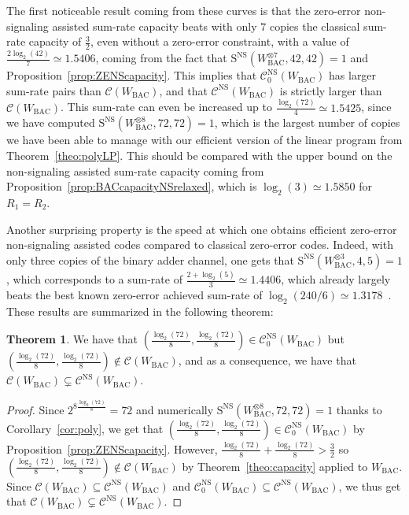 \documentclass[11pt]{article}
\theoremstyle{definition}
\newtheorem{theo}{Theorem}[section]
\theoremstyle{remark}
\begin{document}
  The first noticeable result coming from these curves is that the zero-error non-signaling assisted sum-rate capacity beats with only $7$ copies the classical sum-rate capacity of $\frac{3}{2}$, even without a zero-error constraint, with a value of $\frac{2\log_2(42)}{7} \simeq 1.5406$, coming from the fact that $\mathrm{S}^{\mathrm{NS}}(W^{\otimes 7}_{\mathrm{BAC}},42,42)=1$ and Proposition~\ref{prop:ZENScapacity}. This implies that $\mathcal{C}^{\mathrm{NS}}_0(W_{\text{BAC}})$ has larger sum-rate pairs than $\mathcal{C}(W_{\text{BAC}})$, and that $\mathcal{C}^{\mathrm{NS}}(W_{\text{BAC}})$ is strictly larger than $\mathcal{C}(W_{\text{BAC}})$. This sum-rate can even be increased up to $\frac{\log_2(72)}{4} \simeq 1.5425$, since we have computed $\mathrm{S}^{\mathrm{NS}}(W^{\otimes 8}_{\mathrm{BAC}},72,72)=1$, which is the largest number of copies we have been able to manage with our efficient version of the linear program from Theorem~\ref{theo:polyLP}. This should be compared with the upper bound on the non-signaling assisted sum-rate capacity coming from Proposition~\ref{prop:BACcapacityNSrelaxed}, which is $\log_2(3) \simeq 1.5850$ for $R_1=R_2$.

  Another surprising property is the speed at which one obtains efficient zero-error non-signaling assisted codes compared to classical zero-error codes. Indeed, with only three copies of the binary adder channel, one gets that $\mathrm{S}^{\mathrm{NS}}(W^{\otimes 3}_{\mathrm{BAC}},4,5)=1$, which corresponds to a sum-rate of $\frac{2+\log_2(5)}{3} \simeq 1.4406$, which already largely beats the best known zero-error achieved sum-rate of $\log_2(240/6) \simeq 1.3178$~\cite{MO05}. These results are summarized in the following theorem:

  \begin{theo}
    \label{theo:BAC}
    We have that $\left(\frac{\log_2(72)}{8},\frac{\log_2(72)}{8}\right) \in \mathcal{C}^{\mathrm{NS}}_0(W_{\mathrm{BAC}})$ but $\left(\frac{\log_2(72)}{8},\frac{\log_2(72)}{8}\right) \not\in \mathcal{C}(W_{\mathrm{BAC}})$, and as a consequence, we have that $\mathcal{C}(W_{\mathrm{BAC}}) \subsetneq \mathcal{C}^{\mathrm{NS}}(W_{\mathrm{BAC}})$.
  \end{theo}
  \begin{proof}
    Since $2^{8\frac{\log_2(72)}{8}}=72$ and numerically $\mathrm{S}^{\mathrm{NS}}(W^{\otimes 8}_{\mathrm{BAC}},72,72)=1$ thanks to Corollary~\ref{cor:poly}, we get that  $\left(\frac{\log_2(72)}{8},\frac{\log_2(72)}{8}\right) \in \mathcal{C}^{\mathrm{NS}}_0(W_{\mathrm{BAC}})$ by Proposition~\ref{prop:ZENScapacity}. However, $\frac{\log_2(72)}{8}+\frac{\log_2(72)}{8} > \frac{3}{2}$ so $\left(\frac{\log_2(72)}{8},\frac{\log_2(72)}{8}\right) \not\in \mathcal{C}(W_{\mathrm{BAC}})$ by Theorem~\ref{theo:capacity} applied to $W_{\mathrm{BAC}}$. Since $\mathcal{C}(W_{\mathrm{BAC}}) \subseteq \mathcal{C}^{\mathrm{NS}}(W_{\mathrm{BAC}})$ and $\mathcal{C}^{\mathrm{NS}}_0(W_{\mathrm{BAC}}) \subseteq \mathcal{C}^{\mathrm{NS}}(W_{\mathrm{BAC}})$, we thus get that $\mathcal{C}(W_{\mathrm{BAC}}) \subsetneq \mathcal{C}^{\mathrm{NS}}(W_{\mathrm{BAC}})$.
  \end{proof}
\end{document}
